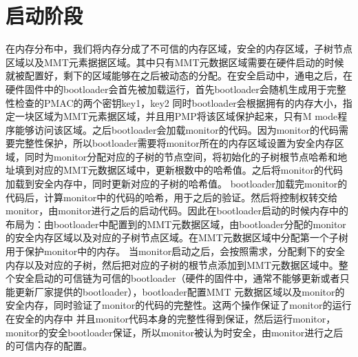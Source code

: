 \section{启动阶段}
在内存分布中，我们将内存分成了不可信的内存区域，安全的内存区域，子树节点区域以及MMT元素据据区域。其中只有MMT元数据区域需要在硬件启动的时候就被配置好，剩下的区域能够在之后被动态的分配。在安全启动中，通电之后，在硬件固件中的bootloader会首先被加载运行，首先bootloader会随机生成用于完整性检查的PMAC的两个密钥key1，key2
同时bootloader会根据拥有的内存大小，指定一块区域为MMT元素据区域，并且用PMP将该区域保护起来，只有M mode程序能够访问该区域。之后bootloader会加载monitor的代码。因为monitor的代码需要完整性保护，所以bootloader需要将monitor所在的内存区域设置为安全内存区域，同时为monitor分配对应的子树的节点空间，将初始化的子树根节点哈希和地址填到对应的MMT元数据区域中，更新根数中的哈希值。之后将monitor的代码加载到安全内存中，同时更新对应的子树的哈希值。
bootloader加载完monitor的代码后，计算monitor中的代码的哈希，用于之后的验证。然后将控制权转交给monitor，由monitor进行之后的启动代码。因此在bootloader启动的时候内存中的布局为：由bootloader中配置到的MMT元数据区域，由bootloader分配的monitor的安全内存区域以及对应的子树节点区域。在MMT元数据区域中分配第一个子树用于保护monitor中的内存。
当monitor启动之后，会按照需求，分配剩下的安全内存以及对应的子树，然后把对应的子树的根节点添加到MMT元数据区域中。整个安全启动的可信链为可信的bootloader（硬件的固件中，通常不能够更新或者只能更新厂家提供的bootloader），bootloader配置MMT 元数据区域以及monitor的安全内存，同时验证了monitor的代码的完整性。这两个操作保证了monitor的运行在安全的内存中
并且monitor代码本身的完整性得到保证，然后运行monitor，monitor的安全bootloader保证，所以monitor被认为时安全，由monitor进行之后的可信内存的配置。

